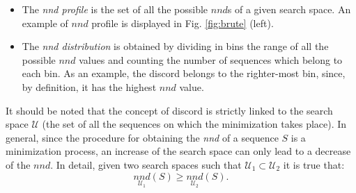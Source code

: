 \documentclass[a4paper,twoside]{article}
\begin{document}
\begin{itemize}

\item The \textit{nnd profile} is the set of all the possible $nnd$s of a given search space. An example of $nnd$ profile is displayed in Fig. \ref{fig:brute} (left).
%
%
\item The \textit{nnd distribution} is obtained by dividing in  bins the range of all the possible $nnd$ values and counting the number of sequences which belong to each bin. As an example, the discord belongs to the righter-most bin, since, by definition, it has the highest $nnd$ value.
\end{itemize}
%
It should be noted that the concept of discord is strictly linked to the search space $\mathcal{U}$ (the set of all the sequences on which the minimization takes place). In general, since the procedure for obtaining the \textit{nnd} of a sequence $S$ is a minimization process, an increase of the search space can only lead to a decrease of the $nnd$. In detail, given two search spaces such that $\mathcal{U}_1 \subset \mathcal{U}_2$ it is true that:
\begin{equation}
\underset{\mathcal{U}_1}
  {nnd}(S) \geq \underset {\mathcal{U}_2}{nnd}(S).
\end{equation}
\end{document}

